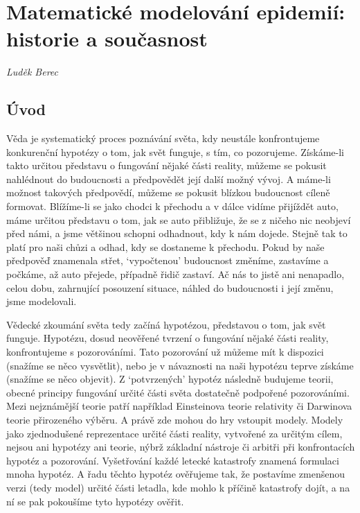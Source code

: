 \chapter{Matematické modelování epidemií: historie a současnost}
\label{Typy_modelu}

\textit{Luděk Berec}
\vspace{15mm}

\section*{Úvod}

Věda je systematický proces poznávání světa, kdy neustále konfrontujeme konkurenční hypotézy o tom, jak svět funguje, s tím, co pozorujeme. Získáme-li takto určitou představu o fungování nějaké části reality, můžeme se pokusit nahlédnout do budoucnosti a předpovědět její další možný vývoj. A máme-li možnost takových předpovědí, můžeme se pokusit blízkou budoucnost cíleně formovat. Blížíme-li se jako chodci k přechodu a v dálce vidíme přijíždět auto, máme určitou představu o tom, jak se auto přibližuje, že se z ničeho nic neobjeví před námi, a jsme většinou schopni odhadnout, kdy k nám dojede. Stejně tak to platí pro naši chůzi a odhad, kdy se dostaneme k přechodu. Pokud by naše předpověď znamenala střet, `vypočtenou' budoucnost změníme, zastavíme a počkáme, až auto přejede, případně řidič zastaví. Ač nás to jistě ani nenapadlo, celou dobu, zahrnující posouzení situace, náhled do budoucnosti i její změnu, jsme modelovali.

Vědecké zkoumání světa tedy začíná hypotézou, představou o tom, jak svět funguje. Hypotézu, dosud neověřené tvrzení o fungování nějaké části reality, konfrontujeme s pozorováními. Tato pozorování už můžeme mít k dispozici (snažíme se něco vysvětlit), nebo je v návaznosti na naši hypotézu teprve získáme (snažíme se něco objevit). Z `potvrzených' hypotéz následně budujeme teorii, obecné principy fungování určité části světa dostatečně podpořené pozorováními. Mezi nejznámější teorie patří například Einsteinova teorie relativity či Darwinova teorie přirozeného výběru. A právě zde mohou do hry vstoupit modely. Modely jako zjednodušené reprezentace určité části reality, vytvořené za určitým cílem, nejsou ani hypotézy ani teorie, nýbrž základní nástroje či arbitři při konfrontacích hypotéz a pozorování. Vyšetřování každé letecké katastrofy znamená formulaci mnoha hypotéz. A řadu těchto hypotéz ověřujeme tak, že postavíme zmenšenou verzi (tedy model) určité části letadla, kde mohlo k příčině katastrofy dojít, a na ní se pak pokoušíme tyto hypotézy ověřit.

